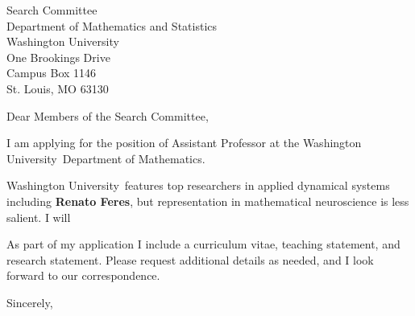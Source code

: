 \documentclass[11pt,a4paper]{letter}
\begin{document}

\def\School{Washington University}

\begin{letter}
{Search Committee\\
Department of Mathematics and Statistics\\
Washington University\\
One Brookings Drive\\
Campus Box 1146\\
St. Louis, MO 63130}


\opening{Dear Members of the Search Committee,}

I am applying for the position of Assistant Professor at the \School~Department of Mathematics. 



\School~features top researchers in applied dynamical systems including \textbf{Renato Feres}, but representation in mathematical neuroscience is less salient. I will 



As part of my application I include a curriculum vitae, teaching statement, and research statement. Please request additional details as needed, and I look forward to our correspondence.

\closing{Sincerely,}
\end{letter}
\end{document}
